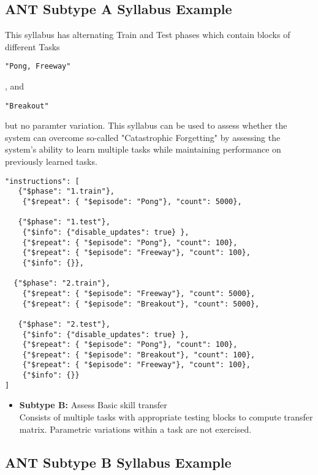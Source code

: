\subsection*{ANT Subtype A Syllabus Example}

This syllabus has alternating Train and Test phases which contain blocks of different Tasks
\begin{small}
\verb|"Pong, Freeway"|
\end{small}
, and
\begin{small}
\verb|"Breakout"|
\end{small} but no paramter variation. This syllabus can be used to assess whether the system can overcome so-called "Catastrophic Forgetting" by assessing the system's ability to learn multiple tasks while maintaining performance on previously learned tasks.

\begin{small}
\begin{verbatim}
"instructions": [    
   {"$phase": "1.train"}, 
    {"$repeat": { "$episode": "Pong"}, "count": 5000}, 

   {"$phase": "1.test"},   
    {"$info": {"disable_updates": true} },
    {"$repeat": { "$episode": "Pong"}, "count": 100},  
    {"$repeat": { "$episode": "Freeway"}, "count": 100},  
    {"$info": {}},
   
  {"$phase": "2.train"},  
    {"$repeat": { "$episode": "Freeway"}, "count": 5000},
    {"$repeat": { "$episode": "Breakout"}, "count": 5000},

   {"$phase": "2.test"},   
    {"$info": {"disable_updates": true} },
    {"$repeat": { "$episode": "Pong"}, "count": 100},
    {"$repeat": { "$episode": "Breakout"}, "count": 100}, 
    {"$repeat": { "$episode": "Freeway"}, "count": 100}, 
    {"$info": {}}
]
\end{verbatim}
\end{small}

\begin{itemize}                   
    \item \textbf{Subtype B:} Assess Basic skill transfer\\
        Consists of multiple tasks with appropriate testing blocks to compute transfer matrix. Parametric variations within a task are not exercised.\\
\end{itemize}

\subsection*{ANT Subtype B Syllabus Example}

